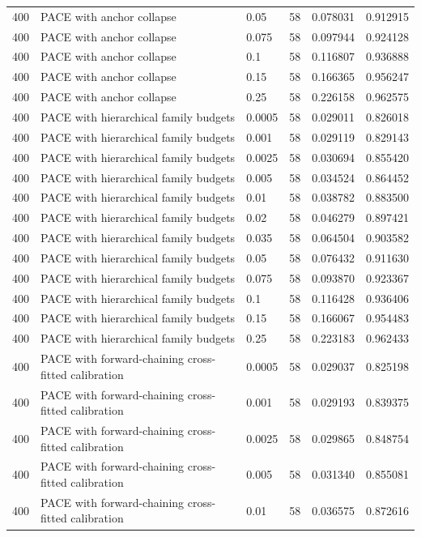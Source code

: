 \begin{tabular}{llllll}
400 & PACE with anchor collapse & 0.05 & 58 & 0.078031 & 0.912915 \\
400 & PACE with anchor collapse & 0.075 & 58 & 0.097944 & 0.924128 \\
400 & PACE with anchor collapse & 0.1 & 58 & 0.116807 & 0.936888 \\
400 & PACE with anchor collapse & 0.15 & 58 & 0.166365 & 0.956247 \\
400 & PACE with anchor collapse & 0.25 & 58 & 0.226158 & 0.962575 \\
400 & PACE with hierarchical family budgets & 0.0005 & 58 & 0.029011 & 0.826018 \\
400 & PACE with hierarchical family budgets & 0.001 & 58 & 0.029119 & 0.829143 \\
400 & PACE with hierarchical family budgets & 0.0025 & 58 & 0.030694 & 0.855420 \\
400 & PACE with hierarchical family budgets & 0.005 & 58 & 0.034524 & 0.864452 \\
400 & PACE with hierarchical family budgets & 0.01 & 58 & 0.038782 & 0.883500 \\
400 & PACE with hierarchical family budgets & 0.02 & 58 & 0.046279 & 0.897421 \\
400 & PACE with hierarchical family budgets & 0.035 & 58 & 0.064504 & 0.903582 \\
400 & PACE with hierarchical family budgets & 0.05 & 58 & 0.076432 & 0.911630 \\
400 & PACE with hierarchical family budgets & 0.075 & 58 & 0.093870 & 0.923367 \\
400 & PACE with hierarchical family budgets & 0.1 & 58 & 0.116428 & 0.936406 \\
400 & PACE with hierarchical family budgets & 0.15 & 58 & 0.166067 & 0.954483 \\
400 & PACE with hierarchical family budgets & 0.25 & 58 & 0.223183 & 0.962433 \\
400 & PACE with forward-chaining cross-fitted calibration & 0.0005 & 58 & 0.029037 & 0.825198 \\
400 & PACE with forward-chaining cross-fitted calibration & 0.001 & 58 & 0.029193 & 0.839375 \\
400 & PACE with forward-chaining cross-fitted calibration & 0.0025 & 58 & 0.029865 & 0.848754 \\
400 & PACE with forward-chaining cross-fitted calibration & 0.005 & 58 & 0.031340 & 0.855081 \\
400 & PACE with forward-chaining cross-fitted calibration & 0.01 & 58 & 0.036575 & 0.872616 \\

\end{tabular}
